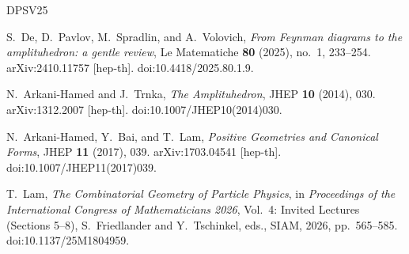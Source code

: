 \documentclass[uplatex,dvipdfmx,a4paper,11pt]{jsarticle}
\numberwithin{equation}{section}
\begin{document}
\begin{thebibliography}{DPSV25}

S.~De, D.~Pavlov, M.~Spradlin, and A.~Volovich,
\emph{From Feynman diagrams to the amplituhedron: a gentle review},
Le Matematiche \textbf{80} (2025), no.~1, 233--254.
arXiv:2410.11757 [hep-th].
doi:10.4418/2025.80.1.9.

N.~Arkani-Hamed and J.~Trnka,
\emph{The Amplituhedron},
JHEP \textbf{10} (2014), 030.
arXiv:1312.2007 [hep-th].
doi:10.1007/JHEP10(2014)030.

N.~Arkani-Hamed, Y.~Bai, and T.~Lam,
\emph{Positive Geometries and Canonical Forms},
JHEP \textbf{11} (2017), 039.
arXiv:1703.04541 [hep-th].
doi:10.1007/JHEP11(2017)039.

T.~Lam,
\emph{The Combinatorial Geometry of Particle Physics},
in \emph{Proceedings of the International Congress of
Mathematicians 2026},
Vol.~4: Invited Lectures (Sections 5--8),
S.~Friedlander and Y.~Tschinkel, eds.,
SIAM, 2026, pp.~565--585.
doi:10.1137/25M1804959.

\end{thebibliography}
\end{document}
